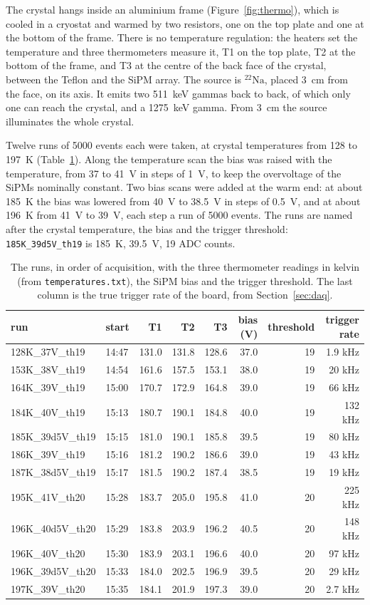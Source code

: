 \documentclass[11pt]{article}
\newcommand{\code}[1]{\texttt{#1}}
\newcommand{\Na}{\ensuremath{{}^{22}\mathrm{Na}}\xspace}
\begin{document}
The crystal hangs inside an aluminium frame (Figure~\ref{fig:thermo}),
which is cooled in a cryostat and warmed by two resistors, one on the top
plate and one at the bottom of the frame. There is no temperature
regulation: the heaters set the temperature and three thermometers measure
it, T1 on the top plate, T2 at the bottom of the frame, and T3 at the
centre of the back face of the crystal, between the Teflon and the SiPM
array. The source is \Na, placed 3~cm from the face, on its axis. It emits
two 511~keV gammas back to back, of which only one can reach the crystal,
and a 1275~keV gamma. From 3~cm the source illuminates the whole crystal.

Twelve runs of 5000 events each were taken, at crystal temperatures from
128 to 197~K (Table~\ref{tab:runs}). Along the temperature scan the bias
was raised with the temperature, from 37 to 41~V in steps of 1~V, to keep
the overvoltage of the SiPMs nominally constant. Two bias scans were added
at the warm end: at about 185~K the bias was lowered from 40~V to 38.5~V in
steps of 0.5~V, and at about 196~K from 41~V to 39~V, each step a run of
5000 events. The runs are named after the crystal temperature, the bias and
the trigger threshold: \code{185K\_39d5V\_th19} is 185~K, 39.5~V, 19 ADC
counts.

\begin{table}[tbp]
\centering
\caption{The runs, in order of acquisition, with the three thermometer
readings in kelvin (from \code{temperatures.txt}), the SiPM bias and the
trigger threshold. The last column is the true trigger rate of the board,
from Section~\ref{sec:daq}.}
\label{tab:runs}
\begin{tabular}{l l r r r r r r}
\toprule
run & start & T1 & T2 & T3 & bias (V) & threshold & trigger rate \\
\midrule
128K\_37V\_th19   & 14:47 & 131.0 & 131.8 & 128.6 & 37.0 & 19 & 1.9 kHz \\
153K\_38V\_th19   & 14:54 & 161.6 & 157.5 & 153.1 & 38.0 & 19 & 20 kHz \\
164K\_39V\_th19   & 15:00 & 170.7 & 172.9 & 164.8 & 39.0 & 19 & 66 kHz \\
184K\_40V\_th19   & 15:13 & 180.7 & 190.1 & 184.8 & 40.0 & 19 & 132 kHz \\
185K\_39d5V\_th19 & 15:15 & 181.0 & 190.1 & 185.8 & 39.5 & 19 & 80 kHz \\
186K\_39V\_th19   & 15:16 & 181.2 & 190.2 & 186.6 & 39.0 & 19 & 43 kHz \\
187K\_38d5V\_th19 & 15:17 & 181.5 & 190.2 & 187.4 & 38.5 & 19 & 19 kHz \\
195K\_41V\_th20   & 15:28 & 183.7 & 205.0 & 195.8 & 41.0 & 20 & 225 kHz \\
196K\_40d5V\_th20 & 15:29 & 183.8 & 203.9 & 196.2 & 40.5 & 20 & 148 kHz \\
196K\_40V\_th20   & 15:30 & 183.9 & 203.1 & 196.6 & 40.0 & 20 & 97 kHz \\
196K\_39d5V\_th20 & 15:33 & 184.0 & 202.5 & 196.9 & 39.5 & 20 & 29 kHz \\
197K\_39V\_th20   & 15:35 & 184.1 & 201.9 & 197.3 & 39.0 & 20 & 2.7 kHz \\
\bottomrule
\end{tabular}
\end{table}
\end{document}
